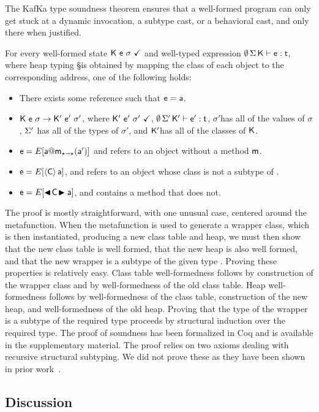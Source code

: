 \documentclass[a4paper,UKenglish]{lipics-v2018}
\makeatletter
\newcommand{\EM}[1]{\ensuremath{#1}\xspace}
\newcommand{\xt}[1]{{\sf{#1}}}
\newcommand{\EMxt}[1]{\EM{\xt{#1}}}
\newcommand{\m}{\EMxt m}
\newcommand{\s}{\EM{\sigma}}
\newcommand{\K}{\EMxt K}
\newcommand{\Kp}{{\EMxt{K'}}}
\renewcommand{\sp}{{{\EM{\s'}}}}
\newcommand{\any}{\EM{\star}}
\newcommand{\DynCall}[3]{\EM{#1@#2_{\any\shortrightarrow\any}(#3)}}
\newcommand{\SubCast}[2]{\EM{\langle{#1}\rangle\,{#2}}}
\newcommand{\BehStart}{\EM{\blacktriangleleft}}
\newcommand{\BehEnd}{\EM{\blacktriangleright}}
\newcommand{\BehCast}[2]{\EM{\BehStart\! #1\! \BehEnd #2}}
\newcommand{\Red}{\EM{\rightarrow}}
\newcommand{\OK}{\EM{~\checkmark}}
\newcommand{\EnvType}[5]{ \EM{#1\,#2\,#3\vdash #4 : #5}}
\newcommand{\WFq}[1]{#1\OK}
\newcommand{\kafka}{{\sf KafKa}\xspace}
\newcounter{theo}
\newcounter{lem}
\makeatother
\begin{document}
The \kafka type soundness theorem ensures that a well-formed program can
only get stuck at a dynamic invocation, a subtype cast, or a behavioral
cast, and only there when justified.

\begin{theorem}[\kafka type soundness]
For every well-formed state $\WFq{\K~\e~\s}$ and well-typed
expression $\EnvType\emptyset\S\K\e\t$, where heap typing \S is obtained by
mapping the class of each object to the corresponding address, one of the
following holds:
\newcommand{\Sp}{\EM{\S'}\xspace}
\begin{itemize}
\item There exists some reference \a such that $\e = \a$.
\item $\K~\e~\s\Red\Kp~\ep~\sp$, where $\WFq{\Kp~\ep~\sp}$,
\EnvType\emptyset\Sp\Kp\ep\t, \sp has all of the values of \s, \Sp has all of the
types of \sp, and \Kp has all of the classes of \K.
\item $\e=E[\DynCall\a\m\ap]$ and \a refers to an object without a method \m.
\item $\e=E[\SubCast\C\a]$, and \a refers to an object whose class is not
a subtype of \C.
\item $\e=E[\BehCast\C\a]$, and \C contains a method that \a does not.
\end{itemize}
\end{theorem}
The proof is mostly straightforward, with one unusual case, centered around
the \xt{bcast} metafunction. When the \xt{bcast} metafunction is used to
generate a wrapper class, which is then instantiated, producing a new class
table and heap, we must then show that the new class table is well formed,
that the new heap is also well formed, and that the new wrapper is a subtype
of the given type \C. Proving these properties is relatively easy. Class
table well-formedness follows by construction of the wrapper class and by
well-formedness of the old class table. Heap well-formedness follows by
well-formedness of the class table, construction of the new heap, and
well-formedness of the old heap. Proving that the type of the wrapper is a
subtype of the required type proceeds by structural induction over the
required type. The proof of soundness has been formalized in Coq and is
available in the supplementary material. The proof relies on two axioms
dealing with recursive structural subtyping. We did not prove these as
they have been shown in prior work~\cite{JonesStructural}.

\subsection{Discussion}
\end{document}
